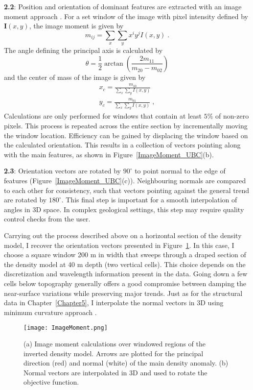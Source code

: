 \textbf{2.2}: Position and orientation of dominant features are extracted with an image moment approach \cite[]{Hu1962}. For a set window of the image with pixel intensity defined by $\mathbf{I}(x,y)$, the image moment is given by
\begin{equation}\label{imagemoment}
m_{ij} = \sum_x\sum_y x^i y^j I(x,y)\;.
\end{equation}
The angle defining the principal axis is calculated by
\begin{equation}
\theta = \frac{1}{2}\arctan \left(\frac{2m_{11}}{m_{20}-m_{02}}\right)
\end{equation}
and the center of mass of the image is given by
\begin{equation}
\begin{split}
x_c = \frac{m_{10}}{\sum_x\sum_y I(x,y)}\\
y_c = \frac{m_{01}}{\sum_x\sum_y I(x,y)}\;,
\end{split}
\end{equation}
Calculations are only performed for windows that contain at least $5\%$ of non-zero pixels.
This process is repeated across the entire section by incrementally moving the window location. Efficiency can be gained by displacing the window based on the calculated orientation.
This results in a collection of vectors pointing along with the main features, as shown in Figure~\ref{ImageMoment_UBC}(b).

\textbf{2.3}: Orientation vectors are rotated by $90^\circ$ to point normal to the edge of features (Figure~\ref{ImageMoment_UBC}(c)). Neighbouring normals are compared to each other for consistency, such that vectors pointing against the general trend are rotated by $180^\circ$. This final step is important for a smooth interpolation of angles in 3D space. In complex geological settings, this step may require quality control checks from the user.

Carrying out the process described above on a horizontal section of the density model, I recover the orientation vectors presented in Figure~\ref{ImageMoment}. In this case, I choose a square window 200 m in width that sweeps through a draped section of the density model at 40 m depth (two vertical cells). This choice depends on the discretization and wavelength information present in the data. Going down a few cells below topography generally offers a good compromise between damping the near-surface variations while preserving major trends. Just as for the structural data in Chapter~\ref{Chapter5}, I interpolate the normal vectors in 3D using minimum curvature approach \cite[]{Briggs74}.
\begin{figure}
\texttt{[image: ImageMoment.png]}
\caption{(a) Image moment calculations over windowed regions of the inverted density model. Arrows are plotted for the principal direction (red) and normal (white) of the main density anomaly. (b) Normal vectors are interpolated in 3D and used to rotate the objective function.}
\label{ImageMoment}
\end{figure}



